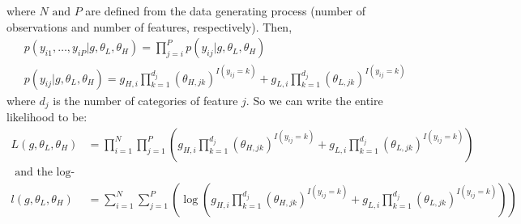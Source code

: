 \documentclass[paper=a4, fontsize=11pt]{scrartcl}
\newcommand{\parens}[1]{ \left( #1 \right) }
\begin{document}
\begin{enumerate}[1.]
\begin{enumerate}[1]
        where $N \text{ and } P$ are defined from the data generating process (number of observations and number of features, respectively). Then,
        \begin{align*}
          & p(y_{i1},\ldots,y_{iP} | g, \theta_L, \theta_H) = \prod_{j = i}^{P}{p(y_{ij} | g, \theta_L, \theta_H)} \\
          & p(y_{ij} | g, \theta_L, \theta_H) = g_{H,i} \prod_{k = 1}^{d_j}{(\theta_{H,jk})^{I(y_{ij} = k)}} + g_{L,i} \prod_{k = 1}^{d_j}{(\theta_{L,jk})^{I(y_{ij} = k)}}
        \end{align*}
        where $d_j$ is the number of categories of feature $j$. So we can write the entire likelihood to be: 
        \begin{align*}
          L(g, \theta_L, \theta_H) &=
            \prod_{i = 1}^{N}{\prod_{j = 1}^{P}{\parens{
                g_{H,i} \prod_{k = 1}^{d_j}{(\theta_{H,jk})^{I(y_{ij} = k)}} + g_{L,i} \prod_{k = 1}^{d_j}{(\theta_{L,jk})^{I(y_{ij} = k)}}
            }}} \\
          \text{ and the log-likelihood: } \\
          l(g, \theta_L, \theta_H) &=
            \sum_{i = 1}^{N} \sum_{j=1}^{P} \parens{\log{ \parens{
              g_{H,i} \prod_{k = 1}^{d_j}{(\theta_{H,jk})^{I(y_{ij} = k)}} + g_{L,i} \prod_{k = 1}^{d_j}{(\theta_{L,jk})^{I(y_{ij} = k)}} 
            }}}
        \end{align*}
    \end{enumerate}
\end{enumerate}
\end{document}
